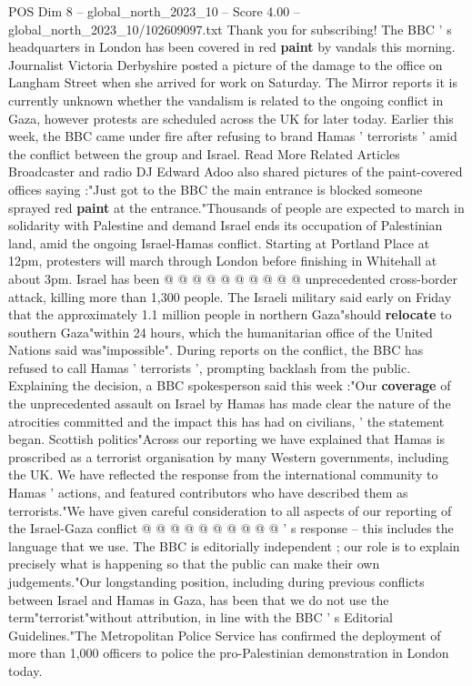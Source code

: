 \begin{textsample}{POS Dim 8 – global\_north\_2023\_10 – Score 4.00 – global\_north\_2023\_10/102609097.txt}  \label{ex:f8_pos_205}
Thank you for subscribing!
The BBC ' s headquarters in London has been covered in red \textbf{paint} by vandals this morning.
Journalist Victoria Derbyshire posted a picture of the damage to the office on Langham Street when she arrived for work on Saturday.
The Mirror reports it is currently unknown whether the vandalism is related to the ongoing conflict in Gaza, however protests are scheduled across the UK for later today.
Earlier this week, the BBC came under fire after refusing to brand Hamas ' terrorists ' amid the conflict between the group and Israel.
Read More Related Articles Broadcaster and radio DJ Edward Adoo also shared pictures of the paint-covered offices saying :"Just got to the BBC the main entrance is blocked someone sprayed red \textbf{paint} at the entrance."Thousands of people are expected to march in solidarity with Palestine and demand Israel ends its occupation of Palestinian land, amid the ongoing Israel-Hamas conflict.
Starting at Portland Place at 12pm, protesters will march through London before finishing in Whitehall at about 3pm.
Israel has been @ @ @ @ @ @ @ @ @ @ unprecedented cross-border attack, killing more than 1,300 people.
The Israeli military said early on Friday that the approximately 1.1 million people in northern Gaza"should \textbf{relocate} to southern Gaza"within 24 hours, which the humanitarian office of the United Nations said was"impossible".
During reports on the conflict, the BBC has refused to call Hamas ' terrorists ', prompting backlash from the public.
Explaining the decision, a BBC spokesperson said this week :"Our \textbf{coverage} of the unprecedented assault on Israel by Hamas has made clear the nature of the atrocities committed and the impact this has had on civilians, ' the statement began.
Scottish politics"Across our reporting we have explained that Hamas is proscribed as a terrorist organisation by many Western governments, including the UK.
We have reflected the response from the international community to Hamas ' actions, and featured contributors who have described them as terrorists."We have given careful consideration to all aspects of our reporting of the Israel-Gaza conflict @ @ @ @ @ @ @ @ @ @ ' s response -- this includes the language that we use.
The BBC is editorially independent ; our role is to explain precisely what is happening so that the public can make their own judgements."Our longstanding position, including during previous conflicts between Israel and Hamas in Gaza, has been that we do not use the term"terrorist"without attribution, in line with the BBC ' s Editorial Guidelines."The Metropolitan Police Service has confirmed the deployment of more than 1,000 officers to police the pro-Palestinian demonstration in London today.

\end{textsample}
